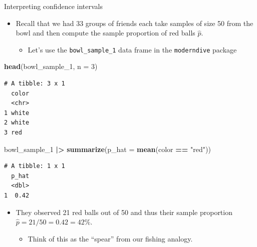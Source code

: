 \documentclass[
  ignorenonframetext,
]{beamer}
\newenvironment{Shaded}{\begin{snugshade}}{\end{snugshade}}
\newcommand{\AttributeTok}[1]{\textcolor[rgb]{0.13,0.29,0.53}{#1}}
\newcommand{\DecValTok}[1]{\textcolor[rgb]{0.00,0.00,0.81}{#1}}
\newcommand{\FunctionTok}[1]{\textcolor[rgb]{0.13,0.29,0.53}{\textbf{#1}}}
\newcommand{\NormalTok}[1]{#1}
\newcommand{\SpecialCharTok}[1]{\textcolor[rgb]{0.81,0.36,0.00}{\textbf{#1}}}
\newcommand{\StringTok}[1]{\textcolor[rgb]{0.31,0.60,0.02}{#1}}
\providecommand{\tightlist}{%
  \setlength{\itemsep}{0pt}\setlength{\parskip}{0pt}}
\begin{document}
\begin{frame}[fragile]{Interpreting confidence intervals}
\protect\hypertarget{interpreting-confidence-intervals-3}{}
\begin{itemize}
\item
  Recall that we had 33 groups of friends each take samples of size 50
  from the bowl and then compute the sample proportion of red balls
  \(\hat{p}\).

  \begin{itemize}
  \tightlist
  \item
    Let's use the \texttt{bowl\_sample\_1} data frame in the
    \texttt{moderndive} package
  \end{itemize}
\end{itemize}

\small

\begin{Shaded}
\begin{Highlighting}[]
\FunctionTok{head}\NormalTok{(bowl\_sample\_1, }\AttributeTok{n =} \DecValTok{3}\NormalTok{)}
\end{Highlighting}
\end{Shaded}

\begin{verbatim}
# A tibble: 3 x 1
  color
  <chr>
1 white
2 white
3 red  
\end{verbatim}

\begin{Shaded}
\begin{Highlighting}[]
\NormalTok{bowl\_sample\_1 }\SpecialCharTok{|\textgreater{}} 
  \FunctionTok{summarize}\NormalTok{(}\AttributeTok{p\_hat =} \FunctionTok{mean}\NormalTok{(color }\SpecialCharTok{==} \StringTok{"red"}\NormalTok{))}
\end{Highlighting}
\end{Shaded}

\begin{verbatim}
# A tibble: 1 x 1
  p_hat
  <dbl>
1  0.42
\end{verbatim}

\normalsize

\begin{itemize}
\item
  They observed 21 red balls out of 50 and thus their sample proportion
  \(\hat{p}=21/50 = 0.42 = 42\%\).

  \begin{itemize}
  \tightlist
  \item
    Think of this as the ``spear'' from our fishing analogy.
  \end{itemize}
\end{itemize}
\end{frame}
\end{document}
